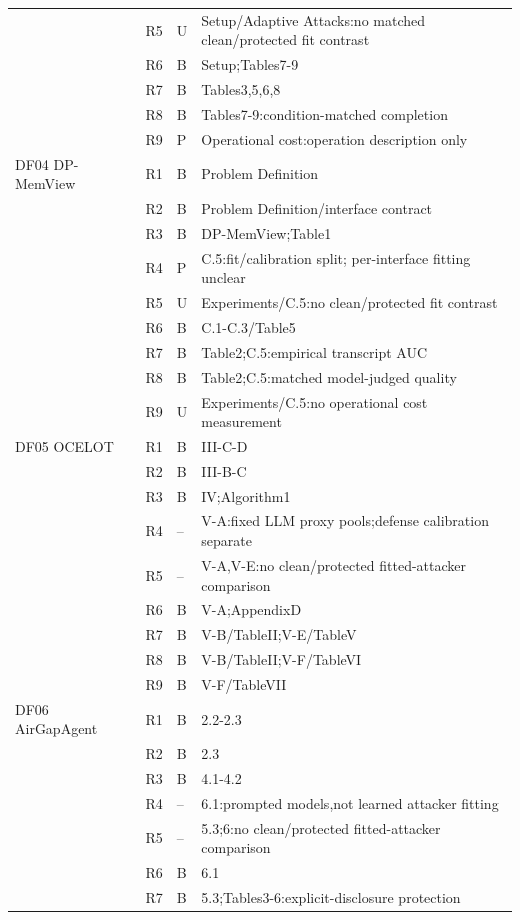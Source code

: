 \begin{longtable}{@{}p{}p{}p{}p{}@{}}
 & R5 & U & Setup/Adaptive Attacks:no matched clean/protected fit contrast\\
 & R6 & B & Setup;Tables7-9\\
 & R7 & B & Tables3,5,6,8\\
 & R8 & B & Tables7-9:condition-matched completion\\
 & R9 & P & Operational cost:operation description only\\
\addlinespace[1pt]
DF04 DP-MemView~\cite{dpmemview2026} & R1 & B & Problem Definition\\
 & R2 & B & Problem Definition/interface contract\\
 & R3 & B & DP-MemView;Table1\\
 & R4 & P & C.5:fit/calibration split; per-interface fitting unclear\\
 & R5 & U & Experiments/C.5:no clean/protected fit contrast\\
 & R6 & B & C.1-C.3/Table5\\
 & R7 & B & Table2;C.5:empirical transcript AUC\\
 & R8 & B & Table2;C.5:matched model-judged quality\\
 & R9 & U & Experiments/C.5:no operational cost measurement\\
\addlinespace[1pt]
DF05 OCELOT~\cite{xie2026ocelot} & R1 & B & III-C-D\\
 & R2 & B & III-B-C\\
 & R3 & B & IV;Algorithm1\\
 & R4 & -- & V-A:fixed LLM proxy pools;defense calibration separate\\
 & R5 & -- & V-A,V-E:no clean/protected fitted-attacker comparison\\
 & R6 & B & V-A;AppendixD\\
 & R7 & B & V-B/TableII;V-E/TableV\\
 & R8 & B & V-B/TableII;V-F/TableVI\\
 & R9 & B & V-F/TableVII\\
\addlinespace[1pt]
DF06 AirGapAgent~\cite{bagdasarian2024airgap} & R1 & B & 2.2-2.3\\
 & R2 & B & 2.3\\
 & R3 & B & 4.1-4.2\\
 & R4 & -- & 6.1:prompted models,not learned attacker fitting\\
 & R5 & -- & 5.3;6:no clean/protected fitted-attacker comparison\\
 & R6 & B & 6.1\\
 & R7 & B & 5.3;Tables3-6:explicit-disclosure protection\\

\end{longtable}
